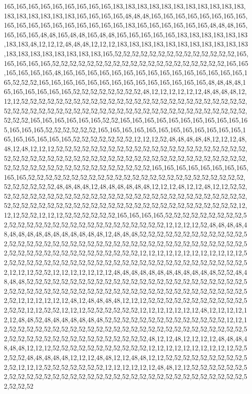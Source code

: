 165,165,165,165,165,165,165,165,165,183,183,183,183,183,183,183,183,183,183,183,183,183,183,183,183,183,165,165,165,165,48,48,48,165,165,165,165,165,165,165,165,165,165,165,165,165,165,165,165,165,165,183,165,165,165,165,165,165,48,48,48,165,165,165,165,48,48,165,48,48,165,48,48,165,165,165,165,165,183,183,183,183,183,183,183,183,48,12,12,12,48,48,48,12,12,12,183,183,183,183,183,183,183,183,183,183,183,183,183,183,183,183,183,183,183,165,52,52,52,52,52,52,52,52,52,52,52,52,52,52,165,165,165,165,165,52,52,52,52,52,52,52,52,52,52,52,52,52,52,52,52,52,52,52,52,165,165,165,165,165,165,48,165,165,165,165,165,165,165,165,165,165,165,165,165,165,165,165,52,52,52,165,165,165,165,165,165,165,165,165,165,165,165,165,165,48,48,48,48,165,165,165,165,165,165,52,52,52,52,52,52,52,52,48,12,12,12,12,12,12,48,48,48,48,12,12,12,52,52,52,52,52,52,52,52,52,52,52,52,52,52,52,52,52,52,52,52,52,52,52,52,52,52,52,52,52,52,52,52,52,52,52,52,52,52,52,52,52,52,52,52,52,52,52,52,52,52,52,52,52,52,52,52,52,165,165,165,165,165,165,52,52,165,165,165,165,165,165,165,165,165,165,165,165,165,165,52,52,52,52,52,52,165,165,165,165,165,165,165,165,165,165,165,165,165,165,165,165,165,165,52,52,52,52,52,52,52,12,12,12,52,48,48,48,48,48,12,12,12,48,48,12,48,12,12,12,52,52,52,52,52,52,52,52,52,52,52,52,52,52,52,52,52,52,52,52,52,52,52,52,52,52,52,52,52,52,52,52,52,52,52,52,52,52,52,52,52,52,52,52,52,52,52,52,52,52,52,52,52,52,52,52,52,52,52,52,52,52,52,52,52,52,52,165,165,165,165,165,165,165,165,165,165,52,52,52,52,52,52,52,52,52,52,52,52,52,52,52,52,52,52,52,52,52,52,52,52,52,52,52,52,52,52,52,48,48,48,48,12,48,48,48,48,48,48,12,12,12,48,12,12,48,12,12,52,52,52,52,52,52,52,52,52,52,52,52,52,52,52,52,52,52,52,52,52,52,52,52,52,52,52,52,52,52,52,52,52,52,52,52,52,52,52,52,52,52,52,52,52,52,52,52,52,52,52,52,52,52,52,52,52,12,12,12,52,52,12,12,12,52,52,52,52,52,52,165,165,165,165,52,52,52,52,52,52,52,52,52,52,52,52,52,52,52,52,52,52,52,52,52,52,52,52,52,52,52,52,12,12,12,12,52,48,48,48,48,48,48,48,48,48,48,48,48,48,48,48,48,12,48,48,48,52,52,52,52,52,52,52,52,52,52,52,52,52,52,52,52,52,52,52,52,52,52,52,52,52,52,52,52,52,52,52,52,52,52,52,52,52,52,52,52,52,52,52,52,52,52,52,52,52,52,52,52,52,52,52,52,12,12,12,12,12,12,12,12,12,12,12,12,52,52,52,52,52,52,52,52,52,52,52,52,52,52,52,52,52,52,52,52,52,52,52,52,52,52,52,52,52,12,12,12,52,52,12,12,12,12,12,12,12,48,48,48,48,48,48,48,48,48,48,48,48,52,52,48,48,48,48,52,52,52,52,52,52,52,52,52,52,52,52,52,52,52,52,52,52,52,52,52,52,52,52,52,52,52,52,52,52,52,52,52,52,52,52,52,52,52,52,52,52,52,52,52,52,52,52,52,52,52,52,52,52,52,12,12,12,12,12,12,48,12,48,48,48,48,12,12,12,52,52,52,52,52,52,52,52,52,52,52,52,52,52,12,12,52,52,12,12,12,52,52,52,52,52,52,12,12,12,12,12,12,12,48,12,12,12,12,12,12,48,48,52,48,48,48,48,48,48,48,52,52,52,52,52,52,52,52,52,52,52,52,52,52,12,12,12,52,52,52,52,52,52,52,52,52,52,52,52,52,52,52,52,52,52,52,52,52,52,52,52,52,52,52,52,52,52,52,52,52,52,52,52,52,52,52,52,52,52,52,52,48,12,12,48,12,12,12,12,48,48,48,48,48,48,12,12,12,52,52,52,52,52,52,52,52,52,52,52,12,12,12,12,12,12,12,12,12,12,52,52,52,52,48,48,48,48,48,12,12,12,48,48,12,12,48,48,12,12,52,52,52,52,52,52,52,52,52,52,52,12,12,12,52,52,52,52,52,52,52,12,12,12,12,12,12,48,48,12,12,52,52,52,52,52,52,52,52,52,52,52,52,52,52,52,52,52,52,52,52,52,52,52,52,52,52,52,52,52,52,52,52,52,52,52,52,52,52
